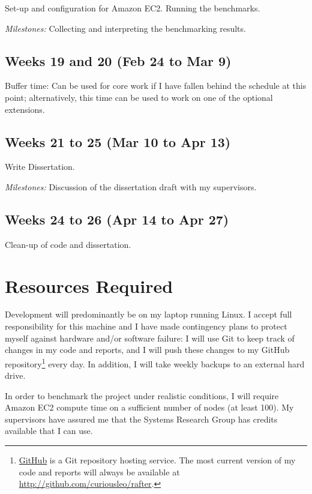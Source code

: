 \documentclass[12pt]{scrartcl}
\begin{document}
Set-up and configuration for Amazon \textsc{EC2}. Running the benchmarks.

\emph{Milestones:} Collecting and interpreting the benchmarking results.

\subsection{Weeks 19 and 20 (Feb 24 to Mar 9)%
  \label{weeks-19-and-20-feb-24-to-mar-9}%
}

Buffer time: Can be used for core work if I have fallen behind the schedule at this point; alternatively, this time can be used to work on one of the optional extensions.

\subsection{Weeks 21 to 25 (Mar 10 to Apr 13)%
  \label{weeks-21-to-25-mar-10-to-apr-13}%
}

Write Dissertation.

\emph{Milestones:} Discussion of the dissertation draft with my supervisors.

\subsection{Weeks 24 to 26 (Apr 14 to Apr 27)%
  \label{weeks-24-to-26-apr-14-to-apr-27}%
}

Clean-up of code and dissertation.

\section{Resources Required%
  \label{resources-required}%
}
%
Development will predominantly be on my laptop running Linux. I accept full responsibility for this machine and I have made contingency plans to protect myself against hardware and/or software failure: I will use Git to keep track of changes in my code and reports, and I will push these changes to my GitHub repository\footnote{\href{http://github.com}{GitHub} is a Git repository hosting service. The most current version of my code and reports will always be available at \url{http://github.com/curiousleo/rafter}.}  every day. In addition, I will take weekly backups to an external hard drive.

In order to benchmark the project under realistic conditions, I will require Amazon \textsc{EC2} compute time on a sufficient number of nodes (at least 100). My supervisors have assured me that the Systems Research Group has credits available that I can use.



\end{document}
